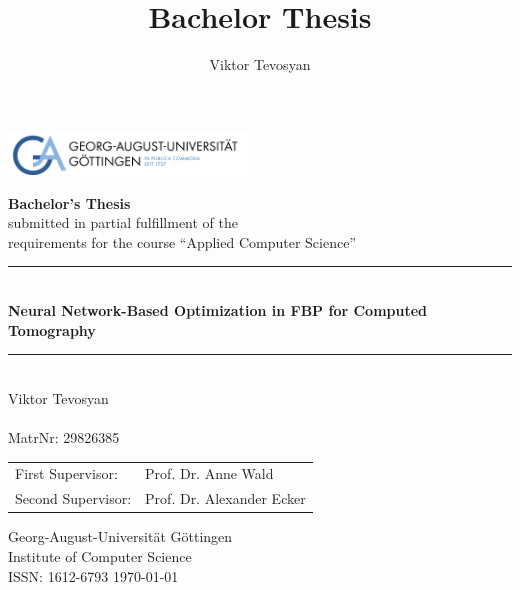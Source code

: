 \documentclass[12pt,a4paper]{article}
\title{Bachelor Thesis}
\author{Viktor Tevosyan}
\date{}
\begin{document}
\newtheorem{definition}{Definition}
\newtheorem{theorem}{Theorem}
\newtheorem{lemma}{Lemma}

\newcommand{\thesistitle}{Neural Network-Based Optimization in FBP for
Computed Tomography}
\newcommand{\firstsupervisor}{Prof. Dr. Anne Wald}
\newcommand{\secondsupervisor}{Prof. Dr. Alexander Ecker}
\newcommand{\authorname}{Viktor Tevosyan}
\newcommand{\university}{Georg-August-Universität Göttingen}
\newcommand{\department}{Institute of Computer Science}
\newcommand{\thesistype}{Bachelor's Thesis} %
\newcommand{\course}{Applied Computer Science}
\newcommand{\matrikelnumber}{29826385}
\newcommand{\keywords}{Put keywords here} %
\newcommand{\documentlanguage}{de-DE} %
\newcommand{\submissiondate}{\today}

\begin{titlepage}
\includegraphics[width=6.5cm]{Bachelorthesis/logo-goettingen.pdf} 
	
\begin{center}
	
	\vspace*{.06\textheight}
	{\LARGE \textbf{\thesistype}\\}
	submitted in partial fulfillment of the\\
	requirements for the course ``\course''\\[0.5cm]
	
	
	\rule{.9\linewidth}{.6pt} \\[0.4cm] %
	{\huge \bfseries \thesistitle}\vspace{0.4cm}
	\rule{.9\linewidth}{.6pt} \\[1.5cm] %
	
	\Large\authorname\\
	\hfill\\
	\large MatrNr: \matrikelnumber\\ \vfill
	\begin{tabular}{@{}ll}
		First Supervisor: &\firstsupervisor\\
		Second Supervisor: &\secondsupervisor
	\end{tabular}
	\vfill
	\university\\
	\department\\
	ISSN: 1612-6793
	\vfill
	{\large \submissiondate}\\[4cm] %
	
	\vfill
\end{center}

\newpage
\vfill




\end{titlepage}
\tableofcontents
\newpage
\end{document}
